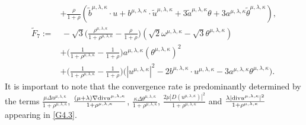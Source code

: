 \documentclass[reqno,11pt]{amsart}
\theoremstyle{plain}
\numberwithin{equation}{section}
\begin{document}
\begin{align*}
&+\frac{\rho}{1+\rho}(\widetilde{b}^{\mu,\lambda,\kappa}\cdot u+b^{\mu,\lambda,\kappa}\cdot \widetilde{u}^{\mu,\lambda,\kappa}
+3\widetilde{a}^{\mu,\lambda,\kappa}\theta+3 {a}^{\mu,\lambda,\kappa}\widetilde{\theta}^{\mu,\lambda,\kappa}),\nonumber\\
\widetilde{F}_7:=&\,-\sqrt{3}\Big(\frac{\rho^{\mu,\lambda,\kappa}}{1+\rho^{\mu,\lambda,\kappa}}
-\frac{\rho}{1+\rho}\Big)(\sqrt{2}\omega^{\mu,\lambda,\kappa}-\sqrt{3}\theta^{\mu,\lambda,\kappa})\nonumber\\
&+\Big(\frac{1}{1+\rho^{\mu,\lambda,\kappa}}-\frac{1}{1+\rho}\Big) a^{\mu,\lambda,\kappa}(\theta^{\mu,\lambda,\kappa})^2\nonumber\\
&+\Big(\frac{1}{1+\rho^{\mu,\lambda,\kappa}}-\frac{1}{1+\rho}\Big)\big(| {u}^{\mu,\lambda,\kappa}|^2-2b^{\mu,\lambda,\kappa}\cdot u^{\mu,\lambda,\kappa}-3a^{\mu,\lambda,\kappa}\theta^{\mu,\lambda,\kappa} \big).
\end{align*} 
It is important to note that the convergence rate is predominantly 
determined by the  terms $\frac{\mu\Delta u^{{\mu,\lambda,\kappa}}}{1+\rho^{{\mu,\lambda,\kappa}}}$,
 $\frac{(\mu+\lambda)\nabla{\rm div}u^{{\mu,\lambda,\kappa}}}{1+\rho^{{\mu,\lambda,\kappa}}}$, 
  $\frac{\kappa\Delta\theta^{\mu,\lambda,\kappa}}{1+\rho^{{\mu,\lambda,\kappa}}}$, 
  $\frac{2\mu |D(u^{\mu,\lambda,\kappa})|^2}{1+\rho^{\mu,\lambda,\kappa}}$ 
and $\frac{ \lambda |{\rm div}u^{\mu,\lambda,\kappa}|^2}{1+\rho^{\mu,\lambda,\kappa}}$ 
appearing in \eqref{G4.3}. 
\end{document}
